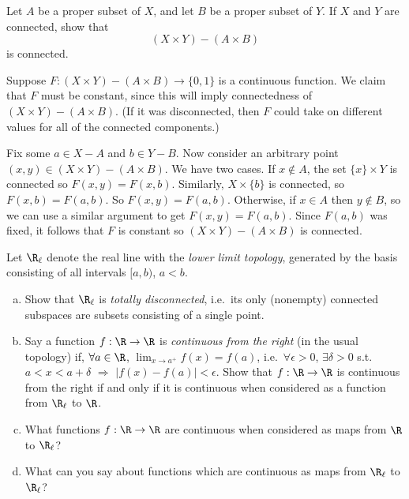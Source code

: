 \documentclass[11pt,letterpaper]{article}
\begin{document}
\begin{problem}
    Let $A$ be a proper subset of $X$, and let $B$ be a proper subset of $Y$. If $X$ and $Y$ are connected, show that
    \[
        (X\times Y) - (A\times B)
    \] 
    is connected. 
\end{problem}

\begin{solution}
    Suppose $F : (X\times Y) - (A\times B) \to \{0, 1\}$ is a continuous function. We claim that $F$ must be constant, since this will imply connectedness of $(X\times Y)-(A\times B)$. (If it was disconnected, then $F$ could take on different values for all of the connected components.) 
    
    Fix some $a\in X-A$ and $b\in Y-B$. Now consider an arbitrary point $(x,y)\in (X\times Y)-(A\times B)$. We have two cases. If $x\not\in A$, the set $\{x\}\times Y$ is connected so $F(x,y)=F(x,b)$. Similarly, $X\times \{b\}$ is connected, so $F(x,b)=F(a,b)$. So $F(x,y)=F(a,b)$. Otherwise, if $x\in A$ then $y\not\in B$, so we can use a similar argument to get $F(x,y)=F(a,b)$. Since $F(a,b)$ was fixed, it follows that $F$ is constant so $(X\times Y) - (A\times B)$ is connected.          
\end{solution}

\begin{problem}
    Let $\R_\ell$ denote the real line with the {\em lower limit topology}, generated by the basis consisting of all intervals $[a,b)$, $a<b$. 
    \begin{enumerate}[(a)]
        \item Show that $\R_\ell$ is {\em totally disconnected}, i.e.\ its only
        (nonempty) connected subspaces are subsets consisting of a single point.
        \item Say a function $f:\R\to \R$ is {\em continuous from the right} (in the
        usual topology) if, $\forall a\in \R$, $\lim_{x\to a^+} f(x)=f(a)$, i.e.\ $\forall \epsilon>0$, $\exists \delta>0$ s.t.\ $a<x<a+\delta$ $\Rightarrow$ $|f(x)-f(a)|<\epsilon$.  Show that $f:\R\to\R$ is continuous from the right if and only if it is continuous when considered as a function from $\R_\ell$ to $\R$.
        \item What functions $f:\R\to\R$ are continuous when considered as maps from
        $\R$ to $\R_\ell$?  
        \item What can you say about functions which are continuous as maps from
        $\R_\ell$ to $\R_\ell$? 
    \end{enumerate}
\end{problem}
\end{document}
